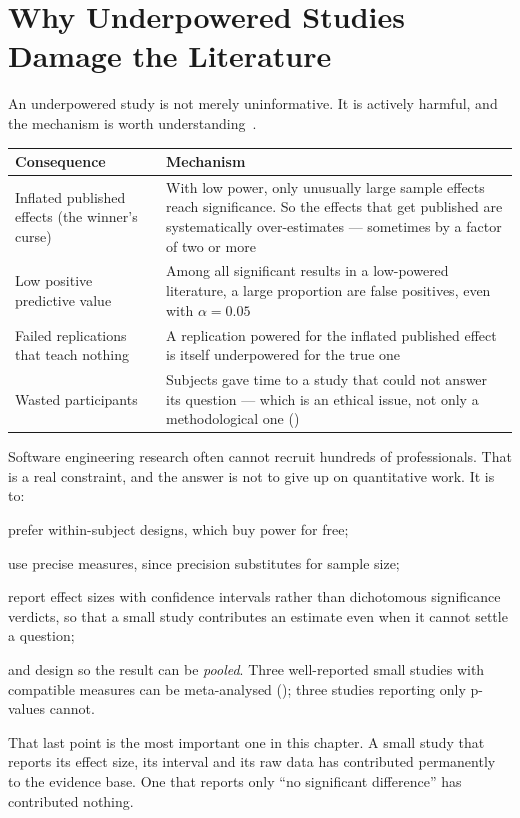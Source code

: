 \section{Why Underpowered Studies Damage the Literature}

An underpowered study is not merely uninformative. It is actively harmful, and
the mechanism is worth understanding~\cite{button2013power}.

\begin{center}
\small
\begin{tabular}{@{}L{3.6cm}L{10.7cm}@{}}
\toprule
\textbf{Consequence} & \textbf{Mechanism} \\
\midrule
Inflated published effects (the winner's curse)
  & With low power, only unusually large sample effects reach significance. So
    the effects that get published are systematically over-estimates ---
    sometimes by a factor of two or more \\
Low positive predictive value
  & Among all significant results in a low-powered literature, a large
    proportion are false positives, even with $\alpha = 0.05$ \\
Failed replications that teach nothing
  & A replication powered for the inflated published effect is itself
    underpowered for the true one \\
Wasted participants
  & Subjects gave time to a study that could not answer its question --- which
    is an ethical issue, not only a methodological one () \\
\bottomrule
\end{tabular}
\end{center}

\begin{conceptbox}
Software engineering research often cannot recruit hundreds of professionals.
That is a real constraint, and the answer is not to give up on quantitative
work. It is to:

\begin{tight}
  \item prefer within-subject designs, which buy power for free;
  \item use precise measures, since precision substitutes for sample size;
  \item report effect sizes with confidence intervals rather than dichotomous
    significance verdicts, so that a small study contributes an estimate even
    when it cannot settle a question;
  \item and design so the result can be \emph{pooled}. Three well-reported
    small studies with compatible measures can be meta-analysed
    (); three studies reporting only p-values cannot.
\end{tight}

\medskip
That last point is the most important one in this chapter. A small study that
reports its effect size, its interval and its raw data has contributed
permanently to the evidence base. One that reports only ``no significant
difference'' has contributed nothing.
\end{conceptbox}

